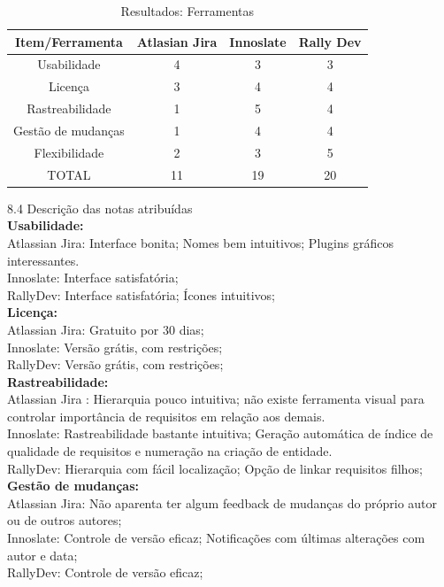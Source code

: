 {{\begin{longtable}{  c c c c }
\caption{Resultados: Ferramentas}\\
\toprule
Item/Ferramenta & Atlasian Jira  & Innoslate & Rally Dev \\ \midrule
\rowcolor[gray]{0.9}
Usabilidade & 4 & 3 & 3 \\
Licença & 3 & 4 & 4 \\
\rowcolor[gray]{0.9}
Rastreabilidade & 1 & 5 & 4 \\
Gestão de mudanças & 1 & 4 & 4 \\
\rowcolor[gray]{0.9}
Flexibilidade & 2 & 3 & 5  \\
TOTAL & 11 & 19 & 20 \\ \bottomrule

\end{longtable}

{\large{8.4 Descrição das notas atribuídas}}\\

\textbf{Usabilidade:}\\
	\tab Atlassian Jira: Interface bonita; Nomes bem intuitivos; Plugins gráficos interessantes.\\
	\tab Innoslate: Interface satisfatória; \\
	\tab RallyDev: Interface satisfatória; Ícones intuitivos;\\

\textbf{Licença:}\\
	\tab Atlassian Jira: Gratuito por 30 dias;\\
	\tab Innoslate: Versão grátis, com restrições;\\
	\tab RallyDev: Versão grátis, com restrições;\\

\textbf{Rastreabilidade:}\\
	\tab Atlassian Jira : Hierarquia pouco intuitiva; não existe ferramenta visual para controlar importância de requisitos em relação aos demais.\\
	\tab Innoslate: Rastreabilidade bastante intuitiva; Geração automática de índice de qualidade de requisitos e numeração na criação de entidade.\\
	\tab RallyDev: Hierarquia com fácil localização; Opção de linkar requisitos filhos;\\

\textbf{Gestão de mudanças:}\\
	\tab Atlassian Jira: Não aparenta ter algum feedback de mudanças do próprio autor ou de outros autores;\\
	\tab Innoslate: Controle de versão eficaz; Notificações com últimas alterações com autor e data;\\
	\tab RallyDev: Controle de versão eficaz;\\

}}
